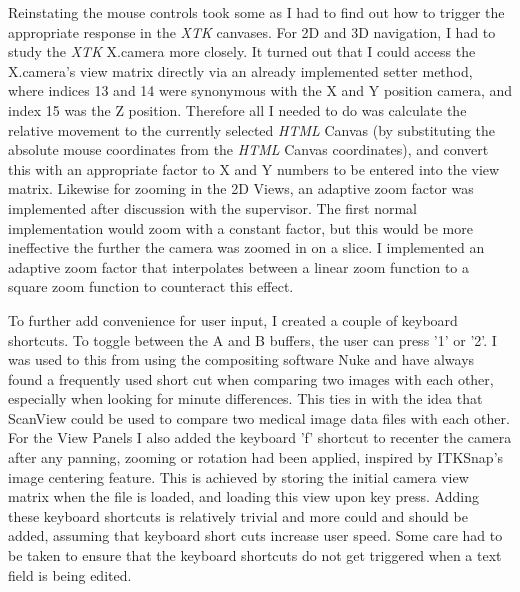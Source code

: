 \documentclass[a4paper,11pt,twoside]{article}
\begin{document}
Reinstating the mouse controls took some as I had to find out how to trigger the appropriate response in the \textit{XTK} canvases. For 2D and 3D navigation, I had to study the \textit{XTK} X.camera more closely. It turned out that I could access the X.camera's view matrix directly via an already implemented setter method, where indices 13 and 14 were synonymous with the X and Y position camera, and index 15 was the Z position. Therefore all I needed to do was calculate the relative movement to the currently selected \textit{HTML} Canvas (by substituting the absolute mouse coordinates from the \textit{HTML} Canvas coordinates), and convert this with an appropriate factor to X and Y numbers to be entered into the view matrix.
Likewise for zooming in the 2D Views, an adaptive zoom factor was implemented after discussion with the supervisor. The first normal implementation would zoom with a constant factor, but this would be more ineffective the further the camera was zoomed in on a slice. I implemented an adaptive zoom factor that interpolates between a linear zoom function to a square zoom function to counteract this effect.

To further add convenience for user input, I created a couple of keyboard shortcuts. To toggle between the A and B buffers, the user can press '1' or '2'. I was used to this from using the compositing software Nuke and have always found a frequently used short cut when comparing two images with each other, especially when looking for minute differences. This ties in with the idea that ScanView could be used to compare two medical image data files with each other. For the View Panels I also added the keyboard 'f' shortcut to recenter the camera after any panning, zooming or rotation had been applied, inspired by ITKSnap's image centering feature. This is achieved by storing the initial camera view matrix when the file is loaded, and loading this view upon key press. Adding these keyboard shortcuts is relatively trivial and more could and should be added, assuming that keyboard short cuts increase user speed. Some care had to be taken to ensure that the keyboard shortcuts do not get triggered when a text field is being edited.
\end{document}
